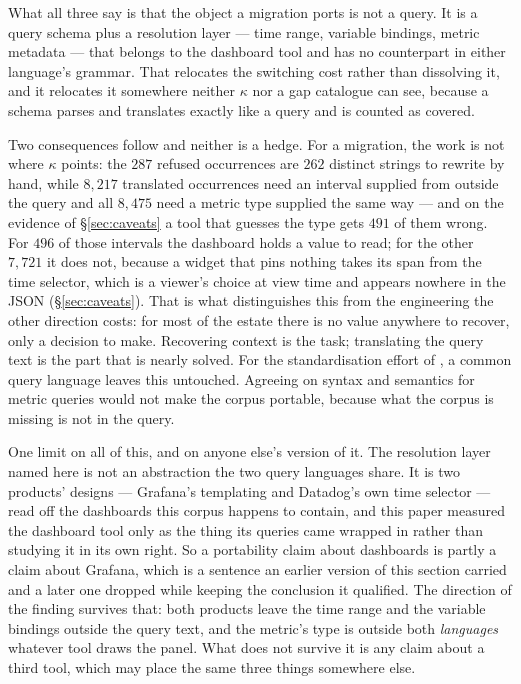 What all three say is that the object a migration ports is not a query. It is a query
schema plus a resolution layer --- time range, variable bindings, metric metadata --- that
belongs to the dashboard tool and has no counterpart in either language's grammar. That
relocates the switching cost rather than dissolving it, and it relocates it somewhere
neither $\kappa$ nor a gap catalogue can see, because a schema parses and translates
exactly like a query and is counted as covered.

Two consequences follow and neither is a hedge. For a migration, the work is not where
$\kappa$ points: the $287$ refused occurrences are $262$ distinct strings to rewrite by
hand, while $8{,}217$ translated occurrences need an interval supplied from outside the query
and all $8{,}475$ need a metric type supplied the same way --- and on the evidence of
\S\ref{sec:caveats} a tool that guesses the type gets $491$ of them wrong. For $496$ of
those intervals the dashboard holds a value to read; for the other $7{,}721$ it does not,
because a widget that pins nothing takes its span from the time selector, which is a
viewer's choice at view time and appears nowhere in the JSON
(\S\ref{sec:caveats}). That is what distinguishes this from the engineering the other
direction costs: for most of the estate there is no value anywhere to recover, only a
decision to make. Recovering context is the task; translating the query text is the part
that is nearly solved. For the standardisation effort of \citet{sharma2025}, a common query
language leaves this untouched. Agreeing on syntax and semantics for metric queries would
not make the corpus portable, because what the corpus is missing is not in the query.

One limit on all of this, and on anyone else's version of it. The resolution layer named
here is not an abstraction the two query languages share. It is two products' designs ---
Grafana's templating and Datadog's own time selector --- read off the dashboards this
corpus happens to contain, and this paper measured the dashboard tool only as the thing
its queries came wrapped in rather than studying it in its own right. So a portability
claim about dashboards is partly a claim about Grafana, which is a sentence an earlier
version of this section carried and a later one dropped while keeping the conclusion it
qualified. The direction of the finding survives that: both products leave the time range
and the variable bindings outside the query text, and the metric's type is outside both
\emph{languages} whatever tool draws the panel. What does not survive it is any claim
about a third tool, which may place the same three things somewhere else.

